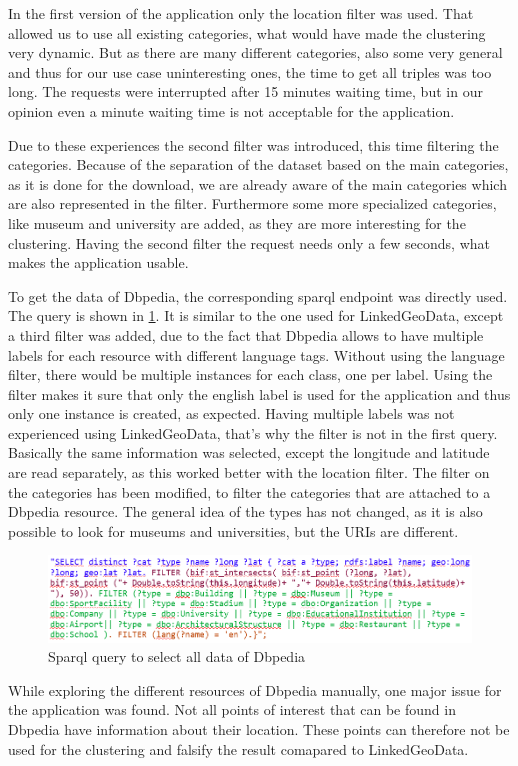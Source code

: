 In the first version of the application only the location filter was used. That allowed us to use all existing categories, what would have made the clustering very dynamic. But as there are many different categories, also some very general and thus for our use case uninteresting ones, the time to get all triples was too long. The requests were interrupted after 15 minutes waiting time, but in our opinion even a minute waiting time is not acceptable for the application. 

Due to these experiences the second filter was introduced, this time filtering the categories. Because of the separation of the dataset based on the main categories, as it is done for the download, we are already aware of the main categories which are also represented in the filter. Furthermore some more specialized categories, like museum and university are added, as they are more interesting for the clustering. Having the second filter the request needs only a few seconds, what makes the application usable.

To get the data of Dbpedia, the corresponding sparql endpoint was directly used. The query is shown in \ref{fig:sparqlDbpedia}. It is similar to the one used for LinkedGeoData, except a third filter was added, due to the fact that Dbpedia allows to have multiple labels for each resource with different language tags. Without using the language filter, there would be multiple instances for each class, one per label. Using the filter makes it sure that only the english label is used for the application and thus only one instance is created, as expected. Having multiple labels was not experienced using LinkedGeoData, that’s why the filter is not in the first query. Basically the same information was selected, except the longitude and latitude are read separately, as this worked better with the location filter. The filter on the categories has been modified, to filter the categories that are attached to a Dbpedia resource. The general idea of the types has not changed, as it is also possible to look for museums and universities, but the URIs are different. 

\begin{figure}
	\centering
	\includegraphics[scale=0.7]{./content/sparqlDbpedia.png}
	\caption{Sparql query to select all data of Dbpedia}\label{fig:sparqlDbpedia}
\end{figure}

While exploring the different resources of Dbpedia manually, one major issue for the application was found. Not all points of interest that can be found in Dbpedia have information about their location. These points can therefore not be used for the clustering and falsify the result comapared to LinkedGeoData.